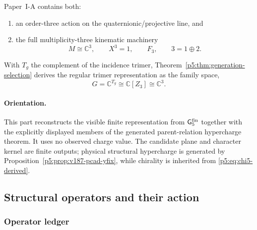 \documentclass[12pt,a4paper]{article}
\begin{document}
Paper~I-A \cite{Kugelmann2026a} contains both:
\begin{enumerate}[label=(\alph*), leftmargin=2em]
\item an order-three action on the quaternionic/projective line, and
\item the full multiplicity-three kinematic machinery
\[
M\cong \mathbb C^3,\qquad X^3=1,\qquad F_3,\qquad 3=1\oplus 2.
\]
\end{enumerate}
With \(T_g\) the complement of the incidence trimer,
Theorem~\ref{p5:thm:generation-selection} derives the regular trimer
representation as the family space,
\[
G=\mathbb C^{T_g}\cong \mathbb C[Z_3]\cong \mathbb C^3.
\]

\label{p5:part:anchor-free-charge}

\paragraph{Orientation.}
This part reconstructs the visible finite representation from
\(\mathsf G_5^{\rm fin}\) together with the explicitly displayed members of
the generated parent-relation hypercharge theorem.  It uses no observed charge value.  The candidate
plane and character kernel are finite outputs; physical structural hypercharge is generated by
Proposition~\ref{p5:prop:v187-pcad-yfix}, while chirality is inherited from
\eqref{p5:eq:chi5-derived}.

\subsection{Structural operators and their action}
\label{p5:sec:part1-action-table}

\subsubsection{Operator ledger}
\end{document}
